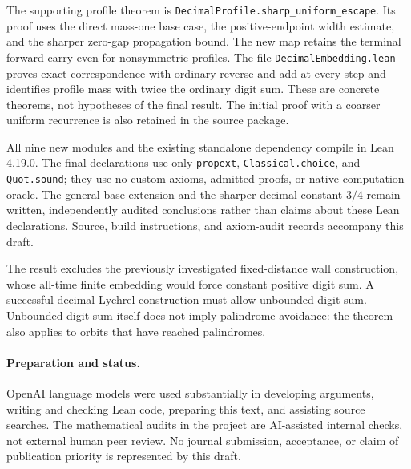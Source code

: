 \documentclass[11pt]{article}
\begin{document}
The supporting profile theorem is
\texttt{DecimalProfile.sharp\_uniform\_escape}. Its proof uses the direct
mass-one base case, the positive-endpoint width estimate, and the sharper
zero-gap propagation bound. The new map retains the terminal forward carry
even for nonsymmetric profiles. The file \texttt{DecimalEmbedding.lean}
proves exact correspondence with ordinary reverse-and-add at every step
and identifies profile mass with twice the ordinary digit sum. These are
concrete theorems, not hypotheses of the final result. The initial proof
with a coarser uniform recurrence is also retained in the source package.

All nine new modules and the existing standalone dependency compile in
Lean 4.19.0. The final declarations use only \texttt{propext},
\texttt{Classical.choice}, and \texttt{Quot.sound}; they use no custom
axioms, admitted proofs, or native computation oracle. The general-base
extension and the sharper decimal constant $3/4$ remain written,
independently audited conclusions rather than claims about these Lean
declarations. Source, build instructions, and axiom-audit records accompany
this draft.

The result excludes the previously investigated fixed-distance wall
construction, whose all-time finite embedding would force constant
positive digit sum. A successful decimal Lychrel construction must allow
unbounded digit sum. Unbounded digit sum itself does not imply palindrome
avoidance: the theorem also applies to orbits that have reached palindromes.

\paragraph{Preparation and status.}
OpenAI language models were used substantially in developing arguments,
writing and checking Lean code, preparing this text, and assisting source
searches. The mathematical audits in the project are AI-assisted internal
checks, not external human peer review. No journal submission, acceptance,
or claim of publication priority is represented by this draft.
\end{document}
